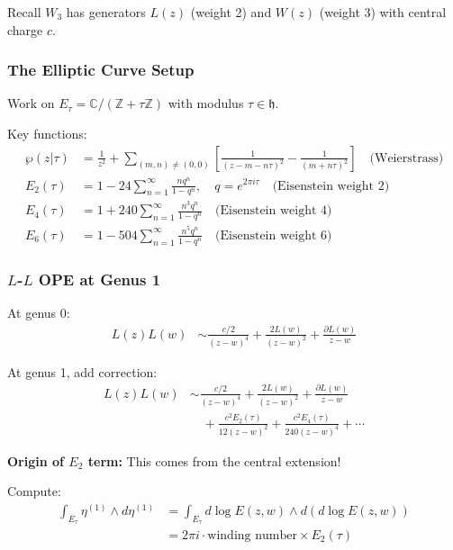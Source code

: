 \begin{example}
Recall $W_3$ has generators $L(z)$ (weight 2) and $W(z)$ (weight 3) with central charge $c$.

\subsubsection{The Elliptic Curve Setup}

Work on $E_\tau = \mathbb{C}/(\mathbb{Z} + \tau\mathbb{Z})$ with modulus $\tau \in \mathfrak{h}$.

Key functions:
\begin{align}
\wp(z|\tau) &= \frac{1}{z^2} + \sum_{(m,n) \neq (0,0)} \left[\frac{1}{(z-m-n\tau)^2} - \frac{1}{(m+n\tau)^2}\right] \quad \text{(Weierstrass)}\\
E_2(\tau) &= 1 - 24\sum_{n=1}^\infty \frac{nq^n}{1-q^n}, \quad q = e^{2\pi i \tau} \quad \text{(Eisenstein weight 2)}\\
E_4(\tau) &= 1 + 240\sum_{n=1}^\infty \frac{n^3 q^n}{1-q^n} \quad \text{(Eisenstein weight 4)}\\
E_6(\tau) &= 1 - 504\sum_{n=1}^\infty \frac{n^5 q^n}{1-q^n} \quad \text{(Eisenstein weight 6)}
\end{align}

\subsubsection{$L$-$L$ OPE at Genus 1}

At genus 0:
\begin{align}
L(z)L(w) &\sim \frac{c/2}{(z-w)^4} + \frac{2L(w)}{(z-w)^2} + \frac{\partial L(w)}{z-w}
\end{align}

At genus 1, add correction:
\begin{align}
L(z)L(w) &\sim \frac{c/2}{(z-w)^4} + \frac{2L(w)}{(z-w)^2} + \frac{\partial L(w)}{z-w} \\
&\quad + \frac{c^2 E_2(\tau)}{12(z-w)^2} + \frac{c^2 E_4(\tau)}{240(z-w)^4} + \cdots
\end{align}

\textbf{Origin of $E_2$ term:} This comes from the central extension! 

Compute:
\begin{align}
\int_{E_\tau} \eta^{(1)} \wedge d\eta^{(1)} &= \int_{E_\tau} d\log E(z,w) \wedge d(d\log E(z,w)) \\
&= 2\pi i \cdot \text{winding number} \times E_2(\tau)
\end{align}


\end{example}
